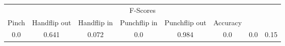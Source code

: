\documentclass{standalone}
\begin{document}
 
 \begin{tabular}{|c|c|c|c|c|c|c ||c|}
\cline{1-8}\multicolumn{8}{|c|}{F-Scores} \\ 
\cline{1-8}Pinch & Handflip out & Handflip in & Punchflip in & Punchflip out & Accuracy\\ 
\cline{1-8}0.0 & 0.641 & 0.072 & 0.0 & 0.984 & 0.0 & 0.0 & 0.15\\ 
 \cline{1-8}\hline \end{tabular}
 
\end{document}

